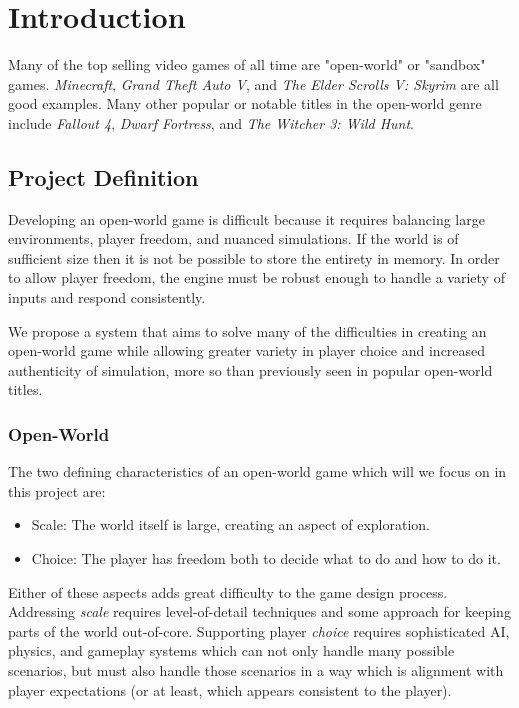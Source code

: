 
\chapter{Introduction}

Many of the top selling video games of all time are "open-world" or "sandbox" games. {\em Minecraft}, {\em Grand Theft Auto V}, and {\em The Elder Scrolls V: Skyrim} are all good examples. Many other popular or notable titles in the open-world genre include {\em Fallout 4}, {\em Dwarf Fortress}, and {\em The Witcher 3: Wild Hunt}.

\section{Project Definition}

Developing an open-world game is difficult because it requires balancing large environments, player freedom, and nuanced simulations. If the world is of sufficient size then it is not be possible to store the entirety in memory. In order to allow player freedom, the engine must be robust enough to handle a variety of inputs and respond consistently.

We propose a system that aims to solve many of the difficulties in creating an open-world game while allowing greater variety in player choice and increased authenticity of simulation, more so than previously seen in popular open-world titles.

\subsection{Open-World}

The two defining characteristics of an open-world game which will we focus on in this project are:

\begin{itemize}
  \item Scale: The world itself is large, creating an aspect of exploration.
  \item Choice: The player has freedom both to decide what to do and how to do it.
\end{itemize}

Either of these aspects adds great difficulty to the game design process. Addressing {\em scale} requires level-of-detail techniques and some approach for keeping parts of the world out-of-core. Supporting player {\em choice} requires sophisticated AI, physics, and gameplay systems which can not only handle many possible scenarios, but must also handle those scenarios in a way which is alignment with player expectations (or at least, which appears consistent to the player).

